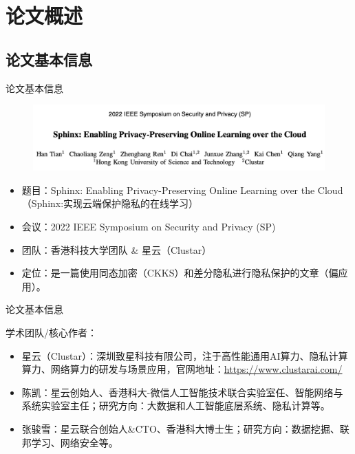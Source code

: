 \documentclass{beamer}
\begin{document}


\section{论文概述}
\subsection{论文基本信息}
\begin{frame}{论文基本信息}
	\begin{figure}[h]
    	\centering
        \includegraphics[height=.3\textheight]{pic/title.png}
    \end{figure} 
	\begin{itemize}
        \item 题目：Sphinx: Enabling Privacy-Preserving Online Learning over the Cloud（Sphinx:实现云端保护隐私的在线学习）
        \item 会议：2022 IEEE Symposium on Security and Privacy (SP)
        \item 团队：香港科技大学团队 \& 星云（Clustar）
        \item 定位：是一篇使用同态加密（CKKS）和差分隐私进行隐私保护的文章（偏应用）。
    \end{itemize}
\end{frame}
\begin{frame}{论文基本信息}
	\begin{exampleblock}{学术团队/核心作者：}
	\begin{itemize}
        \item 星云（Clustar）：深圳致星科技有限公司，注于高性能通用AI算力、隐私计算算力、网络算力的研发与场景应用，官网地址：\url{https://www.clustarai.com/}
        \item 陈凯：星云创始人、香港科大-微信人工智能技术联合实验室任、智能网络与系统实验室主任；研究方向：大数据和人工智能底层系统、隐私计算等。
        \item 张骏雪：星云联合创始人\&CTO、香港科大博士生；研究方向：数据挖掘、联邦学习、网络安全等。
    	\end{itemize}
    \end{exampleblock}
\end{frame}
\end{document}

